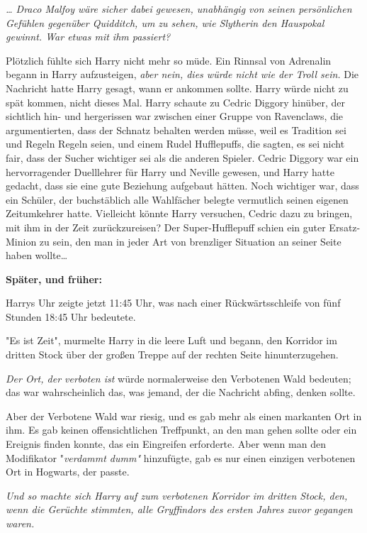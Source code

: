 {\emph{… Draco Malfoy wäre sicher dabei gewesen, unabhängig von seinen persönlichen Gefühlen gegenüber Quidditch, um zu sehen, wie Slytherin den Hauspokal gewinnt. War etwas mit ihm passiert?}

Plötzlich fühlte sich Harry nicht mehr so müde. Ein Rinnsal von Adrenalin begann in Harry aufzusteigen, \emph{aber nein, dies würde nicht wie der Troll sein.} Die Nachricht hatte Harry gesagt, wann er ankommen sollte. Harry würde nicht zu spät kommen, nicht dieses Mal. Harry schaute zu Cedric Diggory hinüber, der sichtlich hin- und hergerissen war zwischen einer Gruppe von Ravenclaws, die argumentierten, dass der Schnatz behalten werden müsse, weil es Tradition sei und Regeln Regeln seien, und einem Rudel Hufflepuffs, die sagten, es sei nicht fair, dass der Sucher wichtiger sei als die anderen Spieler. Cedric Diggory war ein hervorragender Duelllehrer für Harry und Neville gewesen, und Harry hatte gedacht, dass sie eine gute Beziehung aufgebaut hätten. Noch wichtiger war, dass ein Schüler, der buchstäblich alle Wahlfächer belegte vermutlich seinen eigenen Zeitumkehrer hatte. Vielleicht könnte Harry versuchen, Cedric dazu zu bringen, mit ihm in der Zeit zurückzureisen? Der Super-Hufflepuff schien ein guter Ersatz-Minion zu sein, den man in jeder Art von brenzliger Situation an seiner Seite haben wollte…

\textbf{Später, und früher:}

Harrys Uhr zeigte jetzt 11:45 Uhr, was nach einer Rückwärtsschleife von fünf Stunden 18:45 Uhr bedeutete.

"Es ist Zeit", murmelte Harry in die leere Luft und begann, den Korridor im dritten Stock über der großen Treppe auf der rechten Seite hinunterzugehen.

\emph{Der Ort, der verboten ist} würde normalerweise den Verbotenen Wald bedeuten; das war wahrscheinlich das, was jemand, der die Nachricht abfing, denken sollte.

Aber der Verbotene Wald war riesig, und es gab mehr als einen markanten Ort in ihm. Es gab keinen offensichtlichen Treffpunkt, an den man gehen sollte oder ein Ereignis finden konnte, das ein Eingreifen erforderte. Aber wenn man den Modifikator "\emph{verdammt dumm"} hinzufügte, gab es nur einen einzigen verbotenen Ort in Hogwarts, der passte.

\emph{Und so machte sich Harry auf zum verbotenen Korridor im dritten Stock, den, wenn die Gerüchte stimmten, alle Gryffindors des ersten Jahres zuvor gegangen waren.}

}
